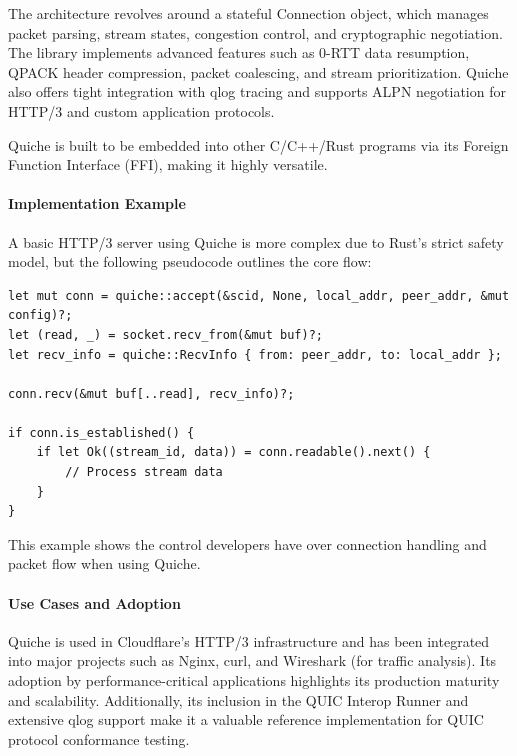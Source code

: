 The architecture revolves around a stateful Connection object, which manages packet parsing, stream states, congestion control, and cryptographic negotiation. The library implements advanced features such as 0-RTT data resumption, QPACK header compression, packet coalescing, and stream prioritization. Quiche also offers tight integration with qlog tracing and supports ALPN negotiation for HTTP/3 and custom application protocols.

Quiche is built to be embedded into other C/C++/Rust programs via its Foreign Function Interface (FFI), making it highly versatile.

\paragraph{Implementation Example}
A basic HTTP/3 server using Quiche is more complex due to Rust's strict safety model, but the following pseudocode outlines the core flow:

\begin{lstlisting}[breaklines=true,basicstyle=\small\ttfamily,frame=single]
let mut conn = quiche::accept(&scid, None, local_addr, peer_addr, &mut config)?;
let (read, _) = socket.recv_from(&mut buf)?;
let recv_info = quiche::RecvInfo { from: peer_addr, to: local_addr };

conn.recv(&mut buf[..read], recv_info)?;

if conn.is_established() {
    if let Ok((stream_id, data)) = conn.readable().next() {
        // Process stream data
    }
}
\end{lstlisting}

This example shows the control developers have over connection handling and packet flow when using Quiche.

\paragraph{Use Cases and Adoption}
Quiche is used in Cloudflare's HTTP/3 infrastructure and has been integrated into major projects such as Nginx, curl, and Wireshark (for traffic analysis). Its adoption by performance-critical applications highlights its production maturity and scalability. Additionally, its inclusion in the QUIC Interop Runner and extensive qlog support make it a valuable reference implementation for QUIC protocol conformance testing.

